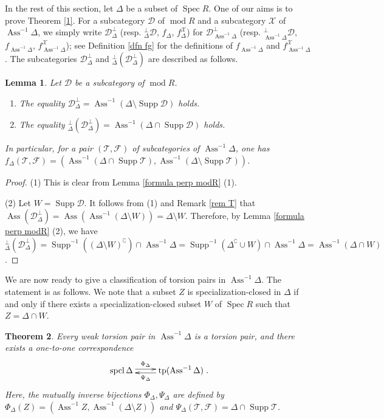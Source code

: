 \documentclass{amsart}
\newtheorem{thm}{Theorem}[section]
\newtheorem{lem}[thm]{Lemma}
\theoremstyle{definition}
\theoremstyle{remark}
\def\Ass{\operatorname{Ass}}
\def\D{\mathcal{D}}
\def\F{\mathcal{F}}
\def\mod{\operatorname{mod}}
\def\spcl{\operatorname{spcl}}
\def\Spec{\operatorname{Spec}}
\def\Supp{\operatorname{Supp}}
\def\T{\mathcal{T}}
\def\tp{\operatorname{tp}}
\def\X{\mathcal{X}}
\begin{document}
In the rest of this section, let $\Delta$ be a subset of $\Spec R$. One of our aims is to prove Theorem \ref{1}. For a subcategory $\D$ of $\mod R$ and a subcategory $\X$ of $\Ass^{-1}\Delta$, we simply write $\D^\perp_\Delta$ (resp. $^\perp_\Delta\D$, $f_\Delta$, $f^\X_\Delta$) for $\D^\perp_{\Ass^{-1}\Delta}$ (resp. $^\perp_{\Ass^{-1}\Delta}\D$, $f_{\Ass^{-1}\Delta}$, $f^\X_{\Ass^{-1}\Delta}$); see Definition \ref{dfn fg} for the definitions of $f_{\Ass^{-1}\Delta}$ and $f^\X_{\Ass^{-1}\Delta}$. The subcategories $\D^\perp_\Delta$ and $^\perp_\Delta(\D^\perp_\Delta)$ are described as follows.

\begin{lem}\label{formula perp delta}
Let $\D$ be a subcategory of $\mod R$.
\begin{enumerate}[\rm(1)]
\item 
The equality $\D^\perp_\Delta=\Ass^{-1}(\Delta\setminus\Supp\D)$ holds.
\item 
The equality $^\perp_\Delta(\D^\perp_\Delta)=\Ass^{-1}(\Delta\cap\Supp\D)$ holds.
\end{enumerate}
In particular, for a pair $(\T,\F)$ of subcategories of $\Ass^{-1}\Delta$, one has $f_\Delta(\T,\F)=(\Ass^{-1}(\Delta\cap\Supp\T),\Ass^{-1}(\Delta\setminus\Supp\T))$.
\end{lem}

\begin{proof}
(1) This is clear from Lemma \ref{formula perp modR} (1).

(2) Let $W=\Supp\D$. It follows from (1) and Remark \ref{rem T} that $\Ass(\D^\perp_\Delta)=\Ass(\Ass^{-1}(\Delta\setminus W))=\Delta\setminus W$. Therefore, by Lemma \ref{formula perp modR} (2), we have $^\perp_\Delta(\D^\perp_\Delta)=\Supp^{-1}((\Delta\setminus W)^\complement )\cap\Ass^{-1}\Delta=\Supp^{-1}(\Delta^\complement \cup W)\cap\Ass^{-1}\Delta=\Ass^{-1}(\Delta\cap W)$.
\end{proof}

We are now ready to give a classification of torsion pairs in $\Ass^{-1}\Delta$. The statement is as follows. We note that a subset $Z$ is specialization-closed in $\Delta$ if and only if there exists a specialization-closed subset $W$ of $\Spec R$ such that $Z=\Delta\cap W$.

\begin{thm}\label{thm tp}
Every weak torsion pair in $\Ass^{-1}\Delta$ is a torsion pair, and there exists a one-to-one correspondence
\[\xymatrix{\spcl\Delta\ar@<0.5ex>[r]^-{\Phi_\Delta}&\tp(\Ass^{-1}\Delta)\ar@<0.5ex>[l]^-{\Psi_\Delta}}.\]
Here, the mutually inverse bijections $\Phi_\Delta,\Psi_\Delta$ are defined by $\Phi_\Delta(Z)=(\Ass^{-1}Z,\Ass^{-1}(\Delta\setminus Z))$ and $\Psi_\Delta(\T,\F)=\Delta\cap\Supp\T$.
\end{thm}
\end{document}
